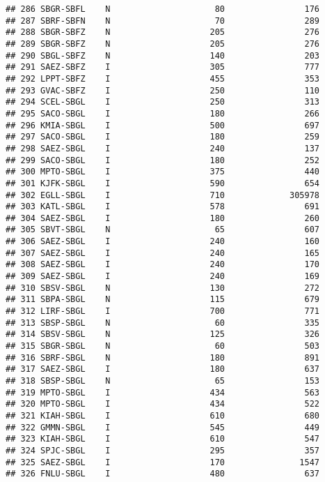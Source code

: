 \documentclass[
]{article}
\begin{document}
\begin{verbatim}
## 286 SBGR-SBFL    N                     80                176
## 287 SBRF-SBFN    N                     70                289
## 288 SBGR-SBFZ    N                    205                276
## 289 SBGR-SBFZ    N                    205                276
## 290 SBGL-SBFZ    N                    140                203
## 291 SAEZ-SBFZ    I                    305                777
## 292 LPPT-SBFZ    I                    455                353
## 293 GVAC-SBFZ    I                    250                110
## 294 SCEL-SBGL    I                    250                313
## 295 SACO-SBGL    I                    180                266
## 296 KMIA-SBGL    I                    500                697
## 297 SACO-SBGL    I                    180                259
## 298 SAEZ-SBGL    I                    240                137
## 299 SACO-SBGL    I                    180                252
## 300 MPTO-SBGL    I                    375                440
## 301 KJFK-SBGL    I                    590                654
## 302 EGLL-SBGL    I                    710             305978
## 303 KATL-SBGL    I                    578                691
## 304 SAEZ-SBGL    I                    180                260
## 305 SBVT-SBGL    N                     65                607
## 306 SAEZ-SBGL    I                    240                160
## 307 SAEZ-SBGL    I                    240                165
## 308 SAEZ-SBGL    I                    240                170
## 309 SAEZ-SBGL    I                    240                169
## 310 SBSV-SBGL    N                    130                272
## 311 SBPA-SBGL    N                    115                679
## 312 LIRF-SBGL    I                    700                771
## 313 SBSP-SBGL    N                     60                335
## 314 SBSV-SBGL    N                    125                326
## 315 SBGR-SBGL    N                     60                503
## 316 SBRF-SBGL    N                    180                891
## 317 SAEZ-SBGL    I                    180                637
## 318 SBSP-SBGL    N                     65                153
## 319 MPTO-SBGL    I                    434                563
## 320 MPTO-SBGL    I                    434                522
## 321 KIAH-SBGL    I                    610                680
## 322 GMMN-SBGL    I                    545                449
## 323 KIAH-SBGL    I                    610                547
## 324 SPJC-SBGL    I                    295                357
## 325 SAEZ-SBGL    I                    170               1547
## 326 FNLU-SBGL    I                    480                637

\end{verbatim}
\end{document}
